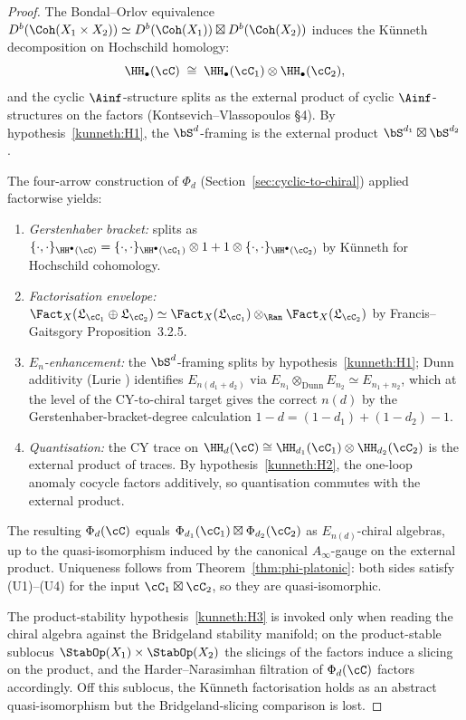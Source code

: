 \begin{proof}
The Bondal--Orlov equivalence $D^b(\Coh(X_1 \times X_2)) \simeq D^b(\Coh(X_1)) \boxtimes D^b(\Coh(X_2))$ induces the K\"unneth decomposition on Hochschild homology:
\[
 \HH_\bullet(\cC) \;\cong\; \HH_\bullet(\cC_1) \otimes \HH_\bullet(\cC_2),
\]
and the cyclic $\Ainf$-structure splits as the external product of cyclic $\Ainf$-structures on the factors \textup{(}Kontsevich--Vlassopoulos \cite{KontsevichVlassopoulos2022} \S 4\textup{).} By hypothesis~\ref{kunneth:H1}, the $\bS^d$-framing is the external product $\bS^{d_1} \boxtimes \bS^{d_2}$.

The four-arrow construction of $\Phi_d$ \textup{(}Section~\textup{\ref{sec:cyclic-to-chiral}}\textup{)} applied factorwise yields:
\begin{enumerate}[label=\textup{(\arabic*)}]
\item \emph{Gerstenhaber bracket:} splits as $\{\cdot, \cdot\}_{\HH^\bullet(\cC)} = \{\cdot, \cdot\}_{\HH^\bullet(\cC_1)} \otimes 1 + 1 \otimes \{\cdot, \cdot\}_{\HH^\bullet(\cC_2)}$ by K\"unneth for Hochschild cohomology.
\item \emph{Factorisation envelope:} $\Fact_X(\mathfrak{L}_{\cC_1} \oplus \mathfrak{L}_{\cC_2}) \simeq \Fact_X(\mathfrak{L}_{\cC_1}) \otimes_{\Ran} \Fact_X(\mathfrak{L}_{\cC_2})$ by Francis--Gaitsgory \cite{FrancisGaitsgory2012} Proposition~3.2.5.
\item \emph{$E_n$-enhancement:} the $\bS^d$-framing splits by hypothesis~\ref{kunneth:H1}; Dunn additivity \textup{(}Lurie \cite[]{LurieHA}\textup{)} identifies $E_{n(d_1+d_2)}$ via $E_{n_1} \otimes_{\mathrm{Dunn}} E_{n_2} \simeq E_{n_1+n_2}$, which at the level of the CY-to-chiral target gives the correct $n(d)$ by the Gerstenhaber-bracket-degree calculation $1 - d = (1 - d_1) + (1 - d_2) - 1$.
\item \emph{Quantisation:} the CY trace on $\HH_d(\cC) \cong \HH_{d_1}(\cC_1) \otimes \HH_{d_2}(\cC_2)$ is the external product of traces. By hypothesis~\ref{kunneth:H2}, the one-loop anomaly cocycle factors additively, so quantisation commutes with the external product.
\end{enumerate}

The resulting $\Phi_d(\cC)$ equals $\Phi_{d_1}(\cC_1) \boxtimes \Phi_{d_2}(\cC_2)$ as $E_{n(d)}$-chiral algebras, up to the quasi-isomorphism induced by the canonical $A_\infty$-gauge on the external product. Uniqueness follows from Theorem~\ref{thm:phi-platonic}: both sides satisfy (U1)--(U4) for the input $\cC_1 \boxtimes \cC_2$, so they are quasi-isomorphic.

The product-stability hypothesis~\ref{kunneth:H3} is invoked only when reading the chiral algebra against the Bridgeland stability manifold; on the product-stable sublocus $\StabOp(X_1) \times \StabOp(X_2)$ the slicings of the factors induce a slicing on the product, and the Harder--Narasimhan filtration of $\Phi_d(\cC)$ factors accordingly. Off this sublocus, the K\"unneth factorisation holds as an abstract quasi-isomorphism but the Bridgeland-slicing comparison is lost.
\end{proof}


